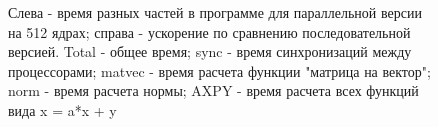 \documentclass[12pt]{article}
\begin{document}
\begin{figure}[htb!]
\begin{minipage}[h]{0.49\linewidth}
\end{minipage}
\hfill
\begin{minipage}[h]{0.49\linewidth}
\end{minipage}
\caption{Слева - время разных частей в программе для параллельной версии на 512 ядрах; справа - ускорение по сравнению последовательной версией. 
Total - общее время; sync - время синхронизаций между процессорами; matvec - время расчета функции "матрица на вектор"; norm - время расчета нормы; 
AXPY - время расчета всех функций вида x = a*x + y}
\end{figure}
\end{document}
